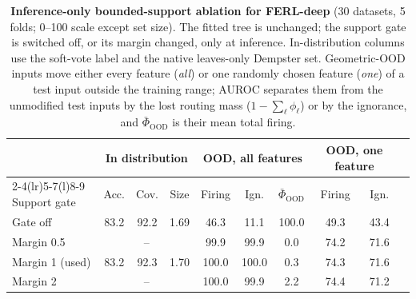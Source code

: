 \begin{table}[t]
\centering
\footnotesize
\setlength{\tabcolsep}{3pt}
\caption{\textbf{Inference-only bounded-support ablation for FERL-deep} (30 datasets, 5 folds; 0--100 scale except set size). The fitted tree is unchanged; the support gate is switched off, or its margin changed, only at inference. In-distribution columns use the soft-vote label and the native leaves-only Dempster set. Geometric-OOD inputs move either every feature (\emph{all}) or one randomly chosen feature (\emph{one}) of a test input outside the training range; AUROC separates them from the unmodified test inputs by the lost routing mass ($1-\sum_\ell\phi_\ell$) or by the ignorance, and $\bar\Phi_{\mathrm{OOD}}$ is their mean total firing.}
\label{tab:bounded-support-ablation}
\begin{tabular}{@{}lccccccccc@{}}
\toprule
& \multicolumn{3}{c}{In distribution} & \multicolumn{3}{c}{OOD, all features} & \multicolumn{2}{c}{OOD, one feature}\\
\cmidrule(lr){2-4}\cmidrule(lr){5-7}\cmidrule(l){8-9}
Support gate & Acc. & Cov. & Size & Firing & Ign. & $\bar\Phi_{\mathrm{OOD}}$ & Firing & Ign.\\
\midrule
Gate off & 83.2 & 92.2 & 1.69 & 46.3 & 11.1 & 100.0 & 49.3 & 43.4\\
Margin 0.5 & \multicolumn{3}{c}{--} & 99.9 & 99.9 & 0.0 & 74.2 & 71.6\\
Margin 1 (used) & 83.2 & 92.3 & 1.70 & 100.0 & 100.0 & 0.3 & 74.3 & 71.6\\
Margin 2 & \multicolumn{3}{c}{--} & 100.0 & 99.9 & 2.2 & 74.4 & 71.2\\
\bottomrule
\end{tabular}
\end{table}
